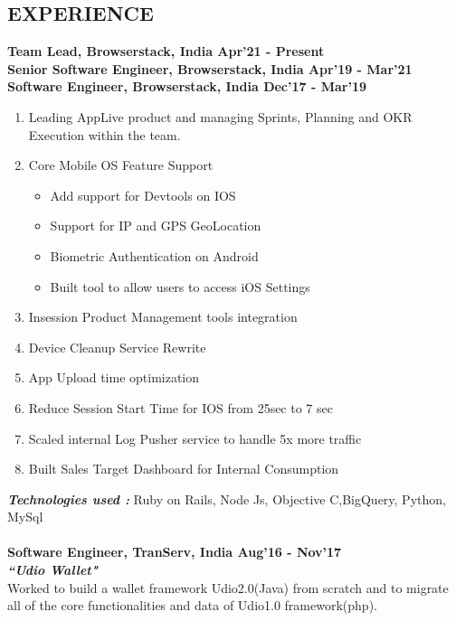 \documentclass[line, margin]{res}
\begin{document}
\address{ +91 9833471993, surajtripathi793@gmail.com}
\begin{resume}

\section{EXPERIENCE} 
\textbf{Team Lead, Browserstack, India \hfill Apr'21 - Present} \\
\textbf{Senior Software Engineer, Browserstack, India \hfill Apr'19 - Mar'21} \\
\textbf{Software Engineer, Browserstack, India \hfill Dec'17 - Mar'19} \\
\begin{enumerate}
   \item Leading AppLive product and managing Sprints, Planning and OKR Execution within the team.
   \item Core Mobile OS Feature Support
   \begin{itemize}
     \item Add support for Devtools on IOS
     \item Support for IP and GPS GeoLocation
     \item Biometric Authentication on Android
     \item Built tool to allow users to access iOS Settings
   \end{itemize}
   \item Insession Product Management tools integration
   \item Device Cleanup Service Rewrite
   \item App Upload time optimization
   \item Reduce Session Start Time for IOS from 25sec to 7 sec
   \item Scaled internal Log Pusher service to handle 5x more traffic
   \item Built Sales Target Dashboard for Internal Consumption
\end{enumerate}
\textbf{\textit{Technologies used : }} Ruby on Rails, Node Js, Objective C,BigQuery, Python, MySql\\
\\
\textbf{Software Engineer, TranServ, India \hfill Aug'16 - Nov'17} \\
\textbf{\textit{``Udio Wallet"}} \\
Worked to build a wallet framework Udio2.0(Java) from scratch and to migrate all of the core functionalities and data of Udio1.0 framework(php). \\

\end{resume}
\end{document}
